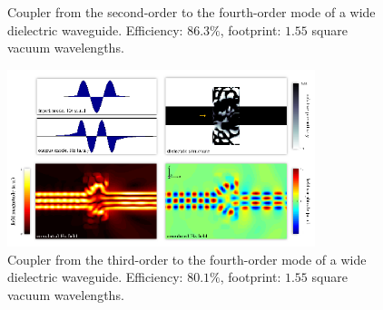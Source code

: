 \documentclass[letterpaper,10pt]{article}
\begin{document}
\begin{appendix}
\begin{figure}[h!]
    \caption{
        Coupler from the second-order to the fourth-order mode 
            of a wide dielectric waveguide.
        Efficiency: $86.3\%$,
        footprint: $1.55$ square vacuum wavelengths.
        }
\end{figure}
\begin{figure}[h!]
    \centering
    \includegraphics[width=0.8\textwidth]{11}
    \caption{
        Coupler from the third-order to the fourth-order mode 
            of a wide dielectric waveguide.
        Efficiency: $80.1\%$,
        footprint: $1.55$ square vacuum wavelengths.
        }
\end{figure}
\clearpage

\end{appendix}
\end{document}
